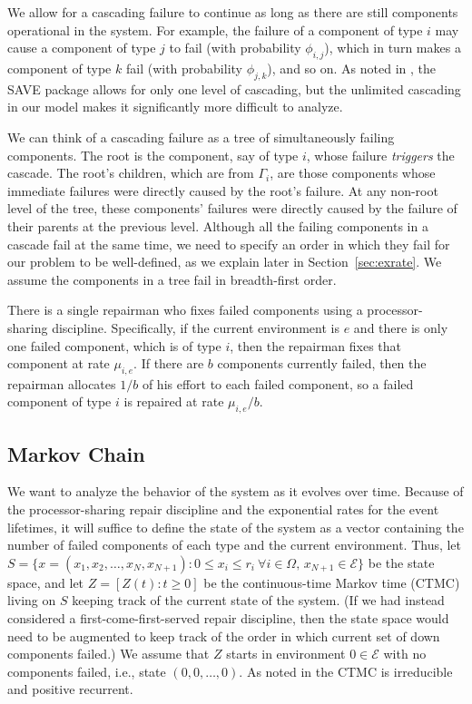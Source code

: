 \documentclass[12pt]{article}
\begin{document}
We allow for a cascading failure to continue as long as there are still
components operational in the system.  For example, the failure of a component
of type $i$ may cause a component of type $j$ to fail (with probability
$\phi_{i, j}$), which in turn makes a component of type $k$ fail (with
probability $\phi_{j, k}$), and so on. As noted in \cite{ING:2009}, the SAVE
package \cite{BHLNS:1994} allows for only one level of cascading, but the
unlimited cascading in our model makes it significantly more difficult to
analyze.

We can think of a cascading failure as a tree of simultaneously failing
components. The root is the component, say of type $i$, whose failure
\textit{triggers} the cascade. The root's children, which are from $\Gamma_i$,
are those components whose immediate failures were directly caused by the root's
failure. At any non-root level of the tree,  these components' failures were
directly caused by the failure of their parents at the previous level. Although
all the failing components in a cascade fail at the same time, we need to
specify an order in which they fail for our problem to be well-defined, as we
explain later in Section~\ref{sec:exrate}. We assume the components in a tree
fail in breadth-first order.

There is a single repairman who fixes failed components using a processor-
sharing discipline. Specifically, if the current environment is $e$ and there is
only one failed component, which is of type $i$, then the repairman fixes that
component at rate $\mu_{i, e}$. If there are $b$ components currently failed,
then the repairman allocates $1 / b$ of his effort to each failed component, so
a failed component of type $i$ is repaired at rate $\mu_{i, e}/b$.

\subsection{Markov Chain}
\label{sec:ctmc}

We want to analyze the behavior of the system as it evolves over time.  Because
of the processor-sharing repair discipline and the exponential rates for the
event lifetimes, it will suffice to define the state of the system as a vector
containing the number of failed components of each type and the current
environment. Thus, let $S = \{ x = (x_1, x_2, \ldots, x_N, x_{N + 1}) : 0 \leq
x_i \leq r_i \ \forall i \in \Omega, \, x_{N + 1} \in \mathcal{E} \}$ be the
state space, and let $Z = [Z(t) : t \geq 0]$ be the continuous-time Markov time
(CTMC) living on $S$ keeping track of the current state of the system. (If we
had instead considered a first-come-first-served repair discipline, then the
state space would need to be augmented to keep track of the order in which
current set of down components failed.) We assume that $Z$ starts in environment
$0 \in \mathcal{E}$ with no components failed, i.e., state $(0,0, \ldots, 0)$.
As noted in \cite{ING:2009} the CTMC is irreducible and positive recurrent.
\end{document}
